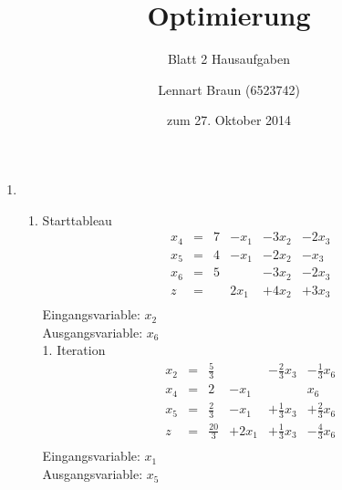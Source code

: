 \documentclass[a4paper]{scrartcl}
\title{Optimierung}
\subtitle{Blatt 2 Hausaufgaben}
\author{
	Lennart Braun (6523742) \\
}
\date{zum 27. Oktober 2014}
\begin{document}
\maketitle

\begin{enumerate}
    \item %
        \begin{enumerate}
            \item
                Starttableau
                \begin{equation}
                    \begin{array}{rcrrrr}
                        x_4 & = & 7 & -x_1 & -3x_2 & -2x_3 \\
                        x_5 & = & 4 & -x_1 & -2x_2 &  -x_3 \\
                        x_6 & = & 5 &      & -3x_2 & -2x_3 \\
                        \hline
                        z   & = &   & 2x_1 & +4x_2 & +3x_3 \\
                    \end{array}
                \end{equation}
                Eingangsvariable: $x_2$ \\
                Ausgangsvariable: $x_6$ \\

                1. Iteration
                \begin{equation}
                    \begin{array}{rcrrrr}
                        x_2 & = & \frac{5}{3} & & -\frac{2}{3}x_3 & -\frac{1}{3}x_6 \\
                        x_4 & = & 2 & -x_1 & & x_6 \\
                        x_5 & = & \frac{2}{3} & -x_1 & +\frac{1}{3}x_3 & +\frac{2}{3}x_6 \\
                        \hline
                        z   & = & \frac{20}{3} & +2x_1 & +\frac{1}{3}x_3 & -\frac{4}{3}x_6 \\
                    \end{array}
                \end{equation}
                Eingangsvariable: $x_1$ \\
                Ausgangsvariable: $x_5$


\end{enumerate}
\end{enumerate}
\end{document}
